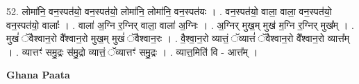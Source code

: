 \documentclass[17pt]{extarticle}
\begin{document}
52. लोमा॑नि॒ वन॒स्पत॑यो॒ वन॒स्पत॑यो॒ लोमा॑नि॒ लोमा॑नि॒ वन॒स्पत॑यः । . वन॒स्पत॑यो॒ वाला॒ वाला॒ वन॒स्पत॑यो॒ वन॒स्पत॑यो॒ वालाः᳚ । . वाला॑ अ॒ग्नि र॒ग्निर् वाला॒ वाला॑ अ॒ग्निः । . अ॒ग्निर् मुख॒म् मुख॑ म॒ग्नि र॒ग्निर् मुख᳚म् । . मुखं॑ ॅवैश्वान॒रो वै᳚श्वान॒रो मुख॒म् मुखं॑ ॅवैश्वान॒रः । . वै॒श्वा॒न॒रो व्यात्तं॒ ॅव्यात्तं॑ ॅवैश्वान॒रो वै᳚श्वान॒रो व्यात्त᳚म् । . व्यात्तꣳ॑ समु॒द्रः स॑मु॒द्रो व्यात्तं॒ ॅव्यात्तꣳ॑ समु॒द्रः । . व्यात्त॒मिति॑ वि - आत्त᳚म् । \newline

\textbf{Ghana Paata } \newline
\end{document}
